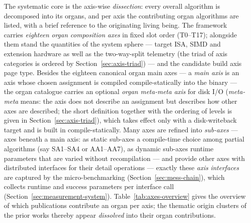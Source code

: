 \begin{nurlang}
The systematic core is the axis-wise \emph{dissection}: every overall algorithm is decomposed into its
organs, and per axis the contributing organ algorithms are listed, with a brief reference to the
originating living being. The framework carries \emph{eighteen organ composition axes} in fixed
slot order (T0--T17); alongside them stand the quantities of the system sphere --- target ISA,
SIMD and extension hardware as well as the two-way-split telemetry (the triad of axis categories
is ordered by Section~\ref{sec:axis-triad}) --- and the candidate build axis page type. Besides the eighteen
canonical organ main axes --- a \emph{main axis} is an axis whose chosen assignment is compiled
compile-statically into the binary --- the organ catalogue carries an optional
\emph{organ meta-meta axis} for disk I/O (\emph{meta-meta} means: the axis does not describe an
assignment but describes how other axes are described; the short definition together with the ordering
of levels is given in Section~\ref{sec:axis-triad}), which takes effect only with a disk-writeback
target and is built in compile-statically. Many axes are refined into \emph{sub-axes} --- axes beneath a
main axis: as static sub-axes a compile-time choice among partial algorithms (say SA1--SA4 or AA1--AA7),
as dynamic sub-axes runtime parameters that are varied without recompilation --- and provide other axes
with distributed interfaces for their detail operations --- exactly these \emph{axis interfaces} are
captured by the micro-benchmarking (Section~\ref{sec:mess-chain}), which collects runtime and success
parameters per interface call (Section~\ref{sec:measurement-system}).
Table~\ref{tab:axes-overview} gives the overview of which publications contribute an organ per
axis; the thematic origin clusters of the prior works thereby appear \emph{dissolved} into their organ
contributions.
\end{nurlang}

